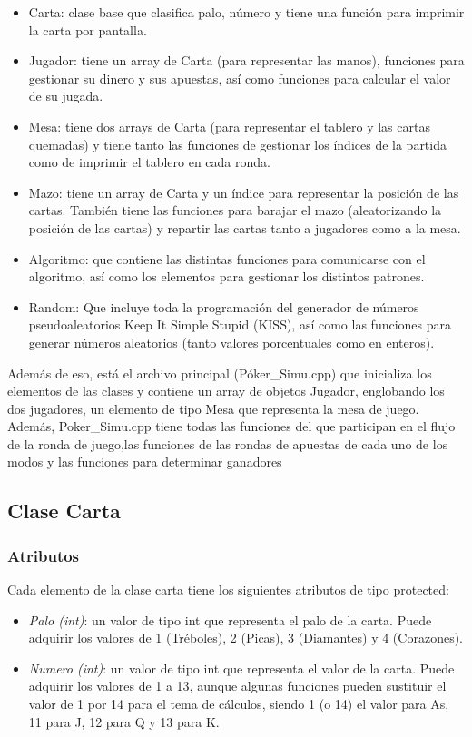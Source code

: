  \begin{itemize}
\item Carta: clase base que clasifica palo, número y tiene una función para imprimir la carta por pantalla. 
\item Jugador: tiene un array de Carta (para representar las manos), funciones para gestionar su dinero y sus apuestas, así como funciones para calcular el valor de su jugada.
\item Mesa: tiene dos arrays de Carta (para representar el tablero y las cartas quemadas) y tiene tanto las funciones de gestionar los índices de la partida como de imprimir el tablero en cada ronda.
\item Mazo: tiene un array de Carta y un índice para representar la posición de las cartas. También tiene las funciones para barajar el mazo (aleatorizando la posición de las cartas) y repartir las cartas tanto a jugadores como a la mesa.
\item Algoritmo: que contiene las distintas funciones para comunicarse con el algoritmo, así como los elementos para gestionar los distintos patrones.
\item Random: Que incluye toda la programación del generador de números pseudoaleatorios Keep It Simple Stupid (KISS), así como las funciones para generar números aleatorios (tanto valores porcentuales como en enteros).
\end{itemize}

Además de eso, está el archivo principal (Póker\_Simu.cpp) que inicializa los elementos de las clases y contiene un array de objetos Jugador, englobando los dos jugadores, un elemento de tipo Mesa que representa la mesa de juego. Además, Poker\_Simu.cpp tiene todas las funciones del que participan en el flujo de la ronda de juego,las funciones de las rondas de apuestas de cada uno de los modos y las funciones para determinar ganadores

\subsection{Clase Carta}
\subsubsection{Atributos}

Cada elemento de la clase carta tiene los siguientes atributos de tipo protected:
 \begin{itemize}
\item \textit{Palo (int)}: un valor de tipo int que representa el palo de la carta. Puede adquirir los valores de 1 (Tréboles), 2 (Picas), 3 (Diamantes) y 4 (Corazones).
\item \textit{Numero (int)}: un valor de tipo int que representa el valor de la carta. Puede adquirir los valores de 1 a 13, aunque algunas funciones pueden sustituir el valor de 1 por 14 para el tema de cálculos, siendo 1 (o 14) el valor para As, 11 para J, 12 para Q y 13 para K.
\end{itemize}

